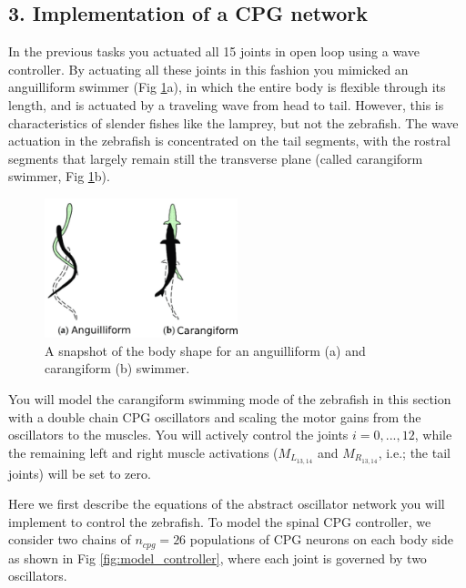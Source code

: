 \documentclass{cmc}
\begin{document}
\subsection*{3. Implementation of a CPG network}

In the previous tasks you actuated all 15 joints in open loop using a wave controller. By actuating all these joints in this fashion you mimicked an anguilliform swimmer (Fig \ref{fig:carangiform}a), in which the entire body is flexible through its length, and is actuated by a traveling wave from head to tail. However, this is characteristics of slender fishes like the lamprey, but not the zebrafish. The wave actuation in the zebrafish is concentrated on the tail segments, with the rostral segments that largely remain still the transverse plane (called carangiform swimmer, Fig \ref{fig:carangiform}b).

\begin{figure}[H]
  \centering \includegraphics[width=0.5\textwidth]{figures/carangiform.png}
  \caption{\label{fig:carangiform} A snapshot of the body shape for an anguilliform (a) and carangiform (b) swimmer.}
\end{figure}

You will model the carangiform swimming mode of the zebrafish in this section with a double chain CPG oscillators and scaling the motor gains from the oscillators to the muscles. You will actively control the joints $i=0,...,12$, while the remaining left and right muscle activations ($M_{L_{13,14}}$ and $M_{R_{13,14}}$, i.e.; the tail joints) will be set to zero.

Here we first describe the equations of the abstract oscillator network you will implement to control the zebrafish. To model the spinal CPG controller, we consider two chains of $n_{cpg}=26$ populations of CPG neurons on each body side as shown in Fig \ref{fig:model_controller}, where each joint is governed by two oscillators.
\end{document}
